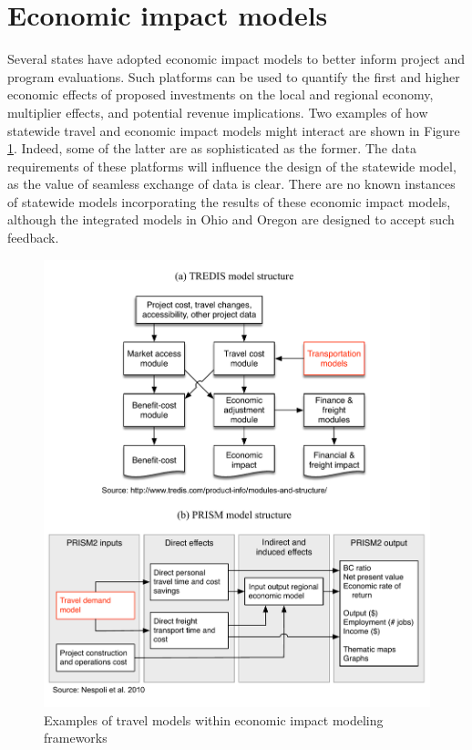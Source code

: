 \section{Economic impact models}\label{sec:economic-impact-models}

Several states have adopted economic impact models to better inform project and program evaluations. Such platforms can be used to quantify the first and higher economic effects of proposed investments on the local and regional economy, multiplier effects, and potential revenue implications. Two examples of how statewide travel and economic impact models might interact are shown in Figure \ref{fig:economic-impact-models}. Indeed, some of the latter are as sophisticated as the former. The data requirements of these platforms will influence the design of the statewide model, as the value of seamless exchange of data is clear. There are no known instances of statewide models incorporating the results of these economic impact models, although the integrated models in Ohio and Oregon are designed to accept such feedback.

\begin{figure}[!t]   %
\centering
\includegraphics[scale=0.7]{graphics/45-economic-impact-models}
\caption{Examples of travel models within economic impact modeling frameworks}
\label{fig:economic-impact-models}
\end{figure}

